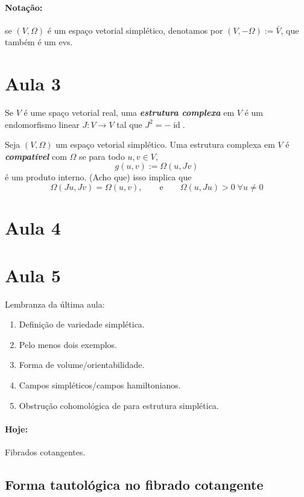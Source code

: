 \paragraph{Nota\c c\~ao:} se $(V,\Omega)$ \'e um espa\c co vetorial simpl\'etico, denotamos por $(V,-\Omega):=\bar{V}$, que tamb\'em \'e um evs.

\section{Aula 3}

Se $V$ é ume spaço vetorial real, uma \textit{\textbf{estrutura complexa}} em $V$ é um endomorfismo linear $J:V\to V$ tal que $J^2=-\operatorname{id}$.

Seja $(V,\Omega)$ um espaço vetorial simplético. Uma estrutura complexa em $V$ é \textit{\textbf{compatível}} com $ \Omega$ se para todo $u, v\in V$,
\[g(u,v):=\Omega(u,Jv)\]
é um produto interno. (Acho que) isso implica que
\[\Omega(Ju,Jv)=\Omega(u,v),\qquad\text{e}  \qquad \Omega(u,Ju)>0\;\forall u \neq 0\]
\section{Aula 4}

\section{Aula 5}

Lembranza da \'ultima aula:
\begin{enumerate}
	\item Defini\c c\~ao de variedade simpl\'etica.
	\item Pelo menos dois exemplos.
	
	\item Forma de volume/orientabilidade.
	
	\item Campos simpl\'eticos/campos hamiltonianos.

	\item Obstru\c c\~ao cohomol\'ogica de para estrutura simpl\'etica.
\end{enumerate}

\paragraph{Hoje:} Fibrados cotangentes.

\subsection{Forma tautol\'ogica no fibrado cotangente}

